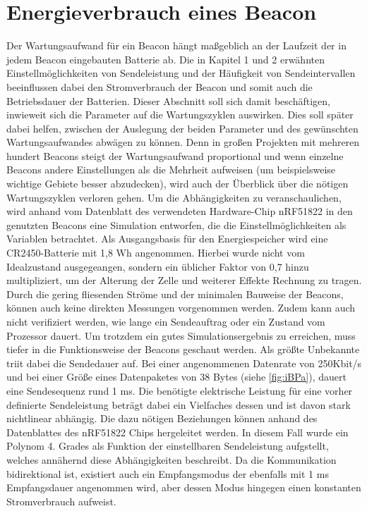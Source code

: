 \section{Energieverbrauch eines Beacon} 
Der Wartungsaufwand für ein Beacon hängt maßgeblich an der Laufzeit der in jedem Beacon eingebauten Batterie ab. Die in Kapitel 1 und 2 erwähnten Einstellmöglichkeiten von Sendeleistung und der Häufigkeit von Sendeintervallen beeinflussen dabei den Stromverbrauch der Beacon und somit auch die Betriebsdauer der Batterien. Dieser Abschnitt soll sich damit beschäftigen, inwieweit sich die Parameter auf die Wartungszyklen auswirken. Dies soll später dabei helfen, zwischen der Auslegung der beiden Parameter und des gewünschten Wartungsaufwandes abwägen zu können. Denn in großen Projekten mit mehreren hundert Beacons steigt der Wartungsaufwand proportional und wenn einzelne Beacons andere Einstellungen als die Mehrheit aufweisen (um beispielsweise wichtige Gebiete besser abzudecken), wird auch der Überblick über die nötigen Wartungszyklen verloren gehen. Um die Abhängigkeiten zu veranschaulichen, wird anhand vom Datenblatt des verwendeten Hardware-Chip nRF51822\cite{nRF5} in den genutzten Beacons eine Simulation entworfen, die die Einstellmöglichkeiten als Variablen betrachtet. Als Ausgangsbasis für den Energiespeicher wird eine CR2450-Batterie mit 1,8 Wh\cite{CR2450} angenommen. Hierbei wurde nicht vom Idealzustand ausgegeangen, sondern ein üblicher Faktor von 0,7 hinzu multipliziert, um der Alterung der Zelle und weiterer Effekte Rechnung zu tragen. Durch die gering fliesenden Ströme und der minimalen Bauweise der Beacons, können auch keine direkten Messungen vorgenommen werden. Zudem kann auch nicht verifiziert werden, wie lange ein Sendeauftrag oder ein Zustand vom Prozessor dauert. Um trotzdem ein gutes Simulationsergebnis zu erreichen, muss tiefer in die Funktionsweise der Beacons geschaut werden. Als größte Unbekannte triit dabei die Sendedauer auf. Bei einer angenommenen Datenrate von 250Kbit/s  und bei einer Größe eines Datenpaketes von 38 Bytes \cite{iBPa} (siehe \ref{fig:iBPa}), dauert eine Sendesequenz rund 1 ms. Die benötigte elektrische Leistung für eine vorher definierte Sendeleistung beträgt dabei ein Vielfaches dessen und ist davon stark nichtlinear abhängig. Die dazu nötigen Beziehungen können anhand des Datenblattes des nRF51822 Chips hergeleitet werden. In diesem Fall wurde ein Polynom 4. Grades als Funktion der einstellbaren Sendeleistung aufgstellt, welches annähernd diese Abhängigkeiten beschreibt. Da die Kommunikation bidirektional ist, existiert auch ein Empfangsmodus der ebenfalls mit 1 ms Empfangsdauer angenommen wird, aber dessen Modus hingegen einen konstanten Stromverbrauch aufweist.
